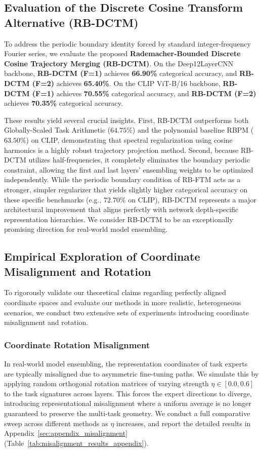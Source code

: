 \subsection{Evaluation of the Discrete Cosine Transform Alternative (RB-DCTM)}
To address the periodic boundary identity forced by standard integer-frequency Fourier series, we evaluate the proposed \textbf{Rademacher-Bounded Discrete Cosine Trajectory Merging (RB-DCTM)}. 
On the Deep12LayerCNN backbone, \textbf{RB-DCTM (F=1)} achieves \textbf{66.90\%} categorical accuracy, and \textbf{RB-DCTM (F=2)} achieves \textbf{65.40\%}. On the CLIP ViT-B/16 backbone, \textbf{RB-DCTM (F=1)} achieves \textbf{70.55\%} categorical accuracy, and \textbf{RB-DCTM (F=2)} achieves \textbf{70.35\%} categorical accuracy.

These results yield several crucial insights. First, RB-DCTM outperforms both Globally-Scaled Task Arithmetic ($64.75\%$) and the polynomial baseline RBPM ($63.50\%$) on CLIP, demonstrating that spectral regularization using cosine harmonics is a highly robust trajectory projection method. Second, because RB-DCTM utilizes half-frequencies, it completely eliminates the boundary periodic constraint, allowing the first and last layers' ensembling weights to be optimized independently. While the periodic boundary condition of RB-FTM acts as a stronger, simpler regularizer that yields slightly higher categorical accuracy on these specific benchmarks (e.g., $72.70\%$ on CLIP), RB-DCTM represents a major architectural improvement that aligns perfectly with network depth-specific representation hierarchies. We consider RB-DCTM to be an exceptionally promising direction for real-world model ensembling.

\subsection{Empirical Exploration of Coordinate Misalignment and Rotation}
To rigorously validate our theoretical claims regarding perfectly aligned coordinate spaces and evaluate our methods in more realistic, heterogeneous scenarios, we conduct two extensive sets of experiments introducing coordinate misalignment and rotation. 

\subsubsection{Coordinate Rotation Misalignment}
In real-world model ensembling, the representation coordinates of task experts are typically misaligned due to asymmetric fine-tuning paths. We simulate this by applying random orthogonal rotation matrices of varying strength $\eta \in [0.0, 0.6]$ to the task signatures across layers. This forces the expert directions to diverge, introducing representational misalignment where a uniform average is no longer guaranteed to preserve the multi-task geometry. We conduct a full comparative sweep across different methods as $\eta$ increases, and report the detailed results in Appendix~\ref{sec:appendix_misalignment} (Table~\ref{tab:misalignment_results_appendix}).


